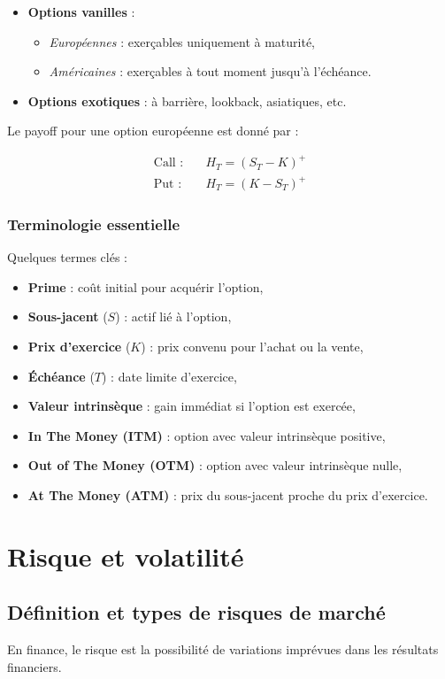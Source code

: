 \begin{itemize}
	\item \textbf{Options vanilles} :
	\begin{itemize}
		\item \textit{Européennes} : exerçables uniquement à maturité,
		\item \textit{Américaines} : exerçables à tout moment jusqu'à l'échéance.
	\end{itemize}
	\item \textbf{Options exotiques} : à barrière, lookback, asiatiques, etc.
\end{itemize}

Le payoff pour une option européenne est donné par :

\begin{align*}
	\text{Call :} & \quad H_T = (S_T - K)^+ \\
	\text{Put :} & \quad H_T = (K - S_T)^+
\end{align*}

\subsubsection{Terminologie essentielle}
Quelques termes clés :

\begin{itemize}
	\item \textbf{Prime} : coût initial pour acquérir l'option,
	\item \textbf{Sous-jacent} ($S$) : actif lié à l'option,
	\item \textbf{Prix d'exercice} ($K$) : prix convenu pour l'achat ou la vente,
	\item \textbf{Échéance} ($T$) : date limite d'exercice,
	\item \textbf{Valeur intrinsèque} : gain immédiat si l'option est exercée,
	\item \textbf{In The Money (ITM)} : option avec valeur intrinsèque positive,
	\item \textbf{Out of The Money (OTM)} : option avec valeur intrinsèque nulle,
	\item \textbf{At The Money (ATM)} : prix du sous-jacent proche du prix d'exercice.
\end{itemize}

\section{Risque et volatilité}

\subsection{Définition et types de risques de marché}
En finance, le risque est la possibilité de variations imprévues dans les résultats financiers.

